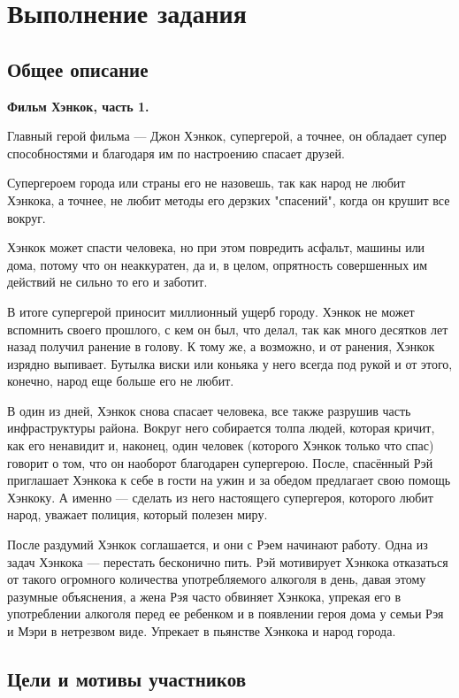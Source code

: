 \section{Выполнение задания}

\subsection*{Общее описание}

\textbf{Фильм Хэнкок, часть 1.} 

Главный герой фильма --- Джон Хэнкок, 
супергерой, а точнее, он обладает супер способностями 
и благодаря им по настроению спасает друзей. 

Супергероем города или страны его не назовешь, 
так как народ не любит Хэнкока, а точнее, 
не любит методы его дерзких "спасений", 
когда он крушит все вокруг. 

Хэнкок может спасти человека, но при этом повредить асфальт, 
машины или дома, потому что он неаккуратен, 
да и, в целом, опрятность совершенных им действий 
не сильно то его и заботит. 

В итоге супергерой приносит миллионный ущерб городу. 
Хэнкок не может вспомнить своего прошлого, с кем он был, 
что делал, так как много десятков лет назад получил ранение в голову. 
К тому же, а возможно, и от ранения, 
Хэнкок изрядно выпивает. 
Бутылка виски или коньяка у него всегда под рукой и от этого, 
конечно, народ еще больше его не любит.

В один из дней, Хэнкок снова спасает человека, 
все также разрушив часть инфраструктуры района. 
Вокруг него собирается толпа людей, которая кричит, 
как его ненавидит и, наконец, один человек 
(которого Хэнкок только что спас) говорит о том, 
что он наоборот благодарен супергерою. 
После, спасённый Рэй приглашает Хэнкока к себе в гости на ужин
и за обедом предлагает свою помощь Хэнкоку.
А именно --- сделать из него настоящего супергероя, 
которого любит народ, уважает полиция, который полезен миру.

После раздумий Хэнкок соглашается, и они с Рэем начинают работу. 
Одна из задач Хэнкока — перестать бесконично пить. 
Рэй мотивирует Хэнкока отказаться от такого огромного количества
употребляемого алкоголя в день, 
давая этому разумные объяснения, 
а жена Рэя часто обвиняет Хэнкока, 
упрекая его в употреблении алкоголя перед ее ребенком 
и в появлении героя дома у семьи Рэя и Мэри в нетрезвом виде. 
Упрекает в пьянстве Хэнкока и народ города.

\subsection*{Цели и мотивы участников}

